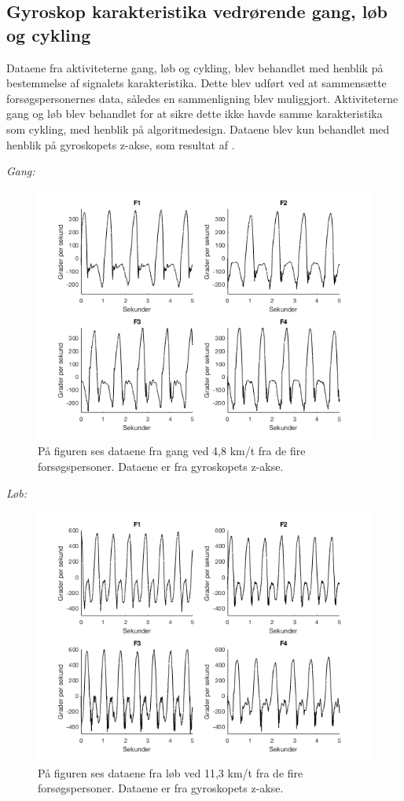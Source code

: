 \subsection{Gyroskop karakteristika vedrørende gang, løb og cykling}
Dataene fra aktiviteterne gang, løb og cykling, blev behandlet med henblik på bestemmelse af signalets karakteristika. Dette blev udført ved at sammensætte forsøgspersonernes data, således en sammenligning blev muliggjort. Aktiviteterne gang og løb blev behandlet for at sikre dette ikke havde samme karakteristika som cykling, med henblik på algoritmedesign. Dataene blev kun behandlet med henblik på gyroskopets z-akse, som resultat af .  

\textit{Gang:}
\begin{figure}[H]
	\centering
	\includegraphics[scale=0.5]{figures/qBilag/gang_gyro}
	\caption{På figuren ses dataene fra gang ved 4,8 km/t fra de fire forsøgspersoner. Dataene er fra gyroskopets z-akse.}
	\label{fig:Ap_cykling}
\end{figure}

\textit{Løb:}
\begin{figure}[H]
	\centering
	\includegraphics[scale=0.5]{figures/qBilag/loeb_gyro}
	\caption{På figuren ses dataene fra løb ved 11,3 km/t fra de fire forsøgspersoner. Dataene er fra gyroskopets z-akse.}
	\label{fig:Ap_cykling}
\end{figure}

